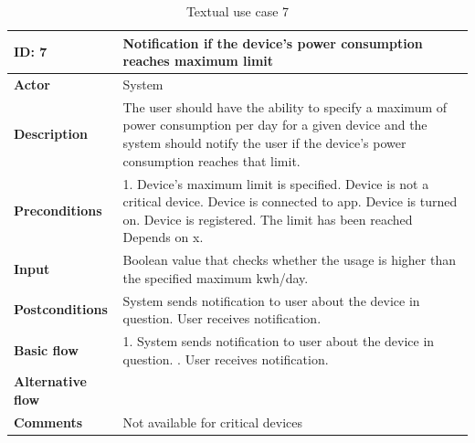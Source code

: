 \begin{table}[H]
\begin{tabular}{|l|p{11.7cm}|}
\hline
\textbf{ID: }7&\textbf{Notification if the device’s power consumption reaches maximum limit}
\\\hline
\textbf{Actor} &System
\\\hline
\textbf{Description}&
The user should have the ability to specify a maximum of power consumption per day for a given device and the system should notify the user if the device’s power consumption reaches that limit.\\\hline
\textbf{Preconditions}&
1. Device’s maximum limit is specified\newline
2. Device is not a critical device\newline
3. Device is connected to app\newline
4. Device is turned on\newline
5. Device is registered\newline
6. The limit has been reached\newline
Depends on x.\\\hline
\textbf{Input}&
Boolean value that checks whether the usage is higher than the specified maximum kwh/day.
\\\hline
\textbf{Postconditions}& 
System sends notification to user about the device in question. User receives notification.
\\\hline
\textbf{Basic flow}&
1. System sends notification to user about the device in question. \newline
2. User receives notification.\newline
\\\hline
\textbf{Alternative flow}&\\\hline
\textbf{Comments}& Not available for critical devices\\\hline
\end{tabular}
\caption{Textual use case 7}
\end{table}


